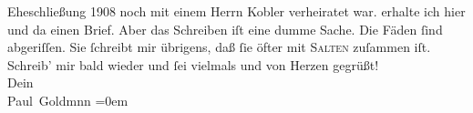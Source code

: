 \begin{ledgroupsized}[t]{13cm}
{{{                  Eheschließung 1908 noch mit einem Herrn Kobler verheiratet war.}}}\label{K_L03211-11h} erhalte ich hier und da
               einen Brief. Aber das Schreiben iſt eine dumme Sache. Die Fäden ſind abgeriſſen. Sie
               ſchreibt mir übrigens, daß ſie öfter mit \textsc{Salten} zuſammen iſt.\pend
           \pstart
           Schreib’ mir bald wieder und ſei vielmals und von Herzen gegrüßt! {\\[\baselineskip]}Dein {\\[\baselineskip]}\spacefill\mbox{Paul Goldmnn}\pend
           \leftskip=0em{}
         
         \endnumbering{}\end{ledgroupsized}  \newcommand{\dateiname}{L03211}\newcommand{\titel}{Paul Goldmann an Arthur Schnitzler, 16. 6. [1902]}\newcommand{\editorInnen}{Martin Anton Müller und Laura Untner}
      
